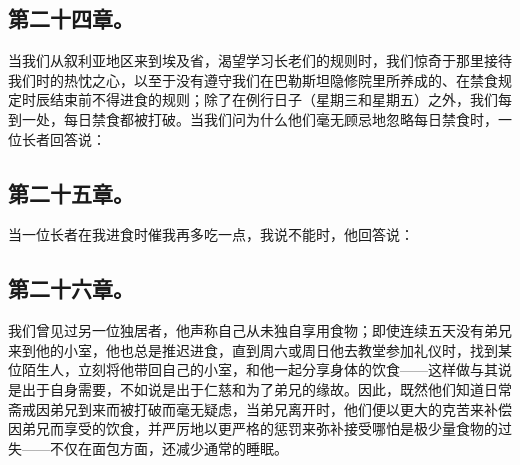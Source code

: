 
\subsection{第二十四章。}

\par

当我们从叙利亚地区来到埃及省，渴望学习长老们的规则时，我们惊奇于那里接待我们时的热忱之心，以至于没有遵守我们在巴勒斯坦隐修院里所养成的、在禁食规定时辰结束前不得进食的规则；除了在例行日子（星期三和星期五）之外，我们每到一处，每日禁食都被打破。当我们问为什么他们毫无顾忌地忽略每日禁食时，一位长者回答说：\par


\subsection{第二十五章。}

\par

当一位长者在我进食时催我再多吃一点，我说不能时，他回答说：\par


\subsection{第二十六章。}

\par

我们曾见过另一位独居者，他声称自己从未独自享用食物；即使连续五天没有弟兄来到他的小室，他也总是推迟进食，直到周六或周日他去教堂参加礼仪时，找到某位陌生人，立刻将他带回自己的小室，和他一起分享身体的饮食——这样做与其说是出于自身需要，不如说是出于仁慈和为了弟兄的缘故。因此，既然他们知道日常斋戒因弟兄到来而被打破而毫无疑虑，当弟兄离开时，他们便以更大的克苦来补偿因弟兄而享受的饮食，并严厉地以更严格的惩罚来弥补接受哪怕是极少量食物的过失——不仅在面包方面，还减少通常的睡眠。\par

